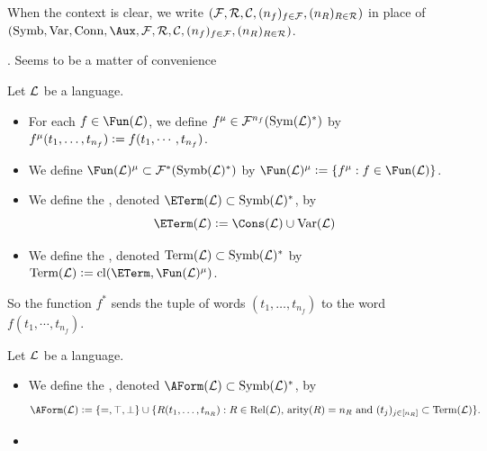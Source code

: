 \documentclass{book}
\begin{document}
	\begin{note}
		When the context is clear, we write $(\mathcal{F}, \mathcal{R}, \mathcal{C}, (n_f)_{f \in \mathcal{F}}, (n_R)_{R \in \mathcal{R}})$ in place of $(\Symb, \Var, \Conn, \Aux, \MF, \MR, \MC, (n_f)_{f \in \MF}, (n_R)_{R \in \MR})$.
	\end{note}
	
	\begin{note}
		. Seems to be a matter of convenience
	\end{note}
	
	\begin{defn}
		Let $\mathcal{L}$ be a language. 
		\begin{itemize}
			\item For each $f \in \Fun(\ML)$, we define $f^{\mu} \in \mathcal{F}^{n_f}(\operatorname{Sym}(\mathcal{L})^*)$ by $f^{\mu}(t_1, \ldots, t_{n_f}) \vcentcolon= f(t_1, \cdots, t_{n_f})$.
			\item We define $\Fun(\ML)^{\mu} \subset \MF^*(\Symb(\ML)^*)$ by $\Fun(\ML)^{\mu} \defeq \{f^{\mu}:f \in \Fun(\ML)\}$.
			\item We define the , denoted $\ETerm(\ML) \subset \Symb(\ML)^*$, by 
			$$ \ETerm(\ML) \defeq \Cons(\ML) \cup \Var(\ML)$$
			\item We define the , denoted $\operatorname{\text{Term}}(\mathcal{L}) \subset \operatorname{\text{Symb}}(\mathcal{L})^*$ by $\Term(\ML) \defeq \cl(\ETerm, \Fun(\ML)^{\mu})$.
		\end{itemize}
	\end{defn}
	
	\begin{note}
		So the function $f^*$ sends the tuple of words $(t_1, \ldots, t_{n_f})$ to the word $f(t_1, \cdots, t_{n_f})$.
	\end{note}
	
	\begin{defn}
		Let $\mathcal{L}$ be a language. 
		\begin{itemize}
			\item We define the , denoted $ \AForm(\ML) \subset \Symb(\ML)^*$, by 
			$$ \AForm(\ML) \defeq \{=, \top, \perp\} \cup \{R(t_1, \ldots, t_{n_R}): \text{$R \in \Rel(\ML)$, $\ar(R) = n_R$ and $(t_j)_{j \in [n_R]} \subset \Term(\ML)$}\}.$$
			\item 
		\end{itemize}
	\end{defn}
	
\end{document}
